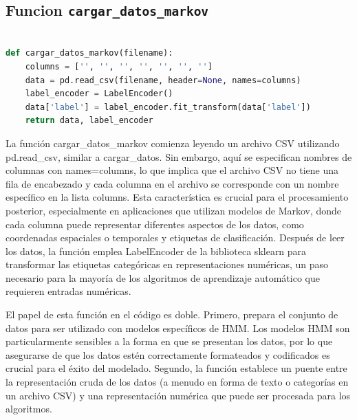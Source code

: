 \documentclass[12pt]{article}
\begin{document}
\vspace{1cm}

\subsection*{Funcion \texttt{cargar\_datos\_markov}}
\vspace{1cm}

\begin{lstlisting}[language=Python]

def cargar_datos_markov(filename):
	columns = ['', '', '', '', '', '', '']
	data = pd.read_csv(filename, header=None, names=columns)
	label_encoder = LabelEncoder()
	data['label'] = label_encoder.fit_transform(data['label'])
	return data, label_encoder

\end{lstlisting}
\vspace{1cm}

La función cargar\_datos\_markov comienza leyendo un archivo CSV utilizando pd.read\_csv, similar a cargar\_datos. Sin embargo, aquí se especifican nombres de columnas con names=columns, lo que implica que el archivo CSV no tiene una fila de encabezado y cada columna en el archivo se corresponde con un nombre específico en la lista columns. Esta característica es crucial para el procesamiento posterior, especialmente en aplicaciones que utilizan modelos de Markov, donde cada columna puede representar diferentes aspectos de los datos, como coordenadas espaciales o temporales y etiquetas de clasificación. Después de leer los datos, la función emplea LabelEncoder de la biblioteca sklearn para transformar las etiquetas categóricas en representaciones numéricas, un paso necesario para la mayoría de los algoritmos de aprendizaje automático que requieren entradas numéricas.\vspace{1cm}

El papel de esta función en el código es doble. Primero, prepara el conjunto de datos para ser utilizado con modelos específicos de HMM. Los modelos HMM son particularmente sensibles a la forma en que se presentan los datos, por lo que asegurarse de que los datos estén correctamente formateados y codificados es crucial para el éxito del modelado. Segundo, la función establece un puente entre la representación cruda de los datos (a menudo en forma de texto o categorías en un archivo CSV) y una representación numérica que puede ser procesada para los algoritmos.

\vspace{1cm}
\end{document}
